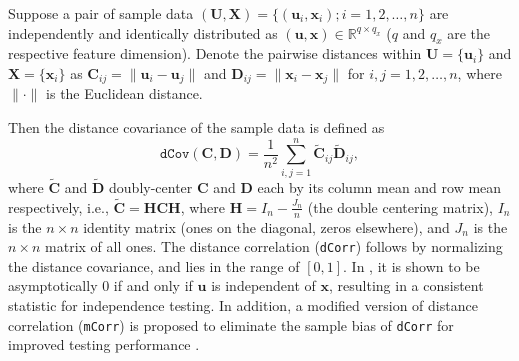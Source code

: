 \documentclass[11pt]{article}
\theoremstyle{definition}
\begin{document}
Suppose a pair of sample data $(\mathbf{U}, \mathbf{X}) = \{  (\mathbf{u}_{i}, \mathbf{x}_{i} ); i = 1,2, \ldots, n \}$ are independently and identically distributed as $(\mathbf{u},\mathbf{x}) \in \mathbb{R}^{q \times q_x}$ ($q$ and $q_x$ are the respective feature dimension). Denote the pairwise distances within $\mathbf{U}=\{\mathbf{u}_{i}\}$ and $\mathbf{X}=\{\mathbf{x}_{i}\}$ as $\mathbf{C}_{ij} = \| \mathbf{u}_{i} - \mathbf{u}_{j} \|$ and $\mathbf{D}_{ij} = \| \mathbf{x}_{i} - \mathbf{x}_{j} \|$ for $i,j=1,2, \ldots , n$, where $\| \cdot \|$ is the Euclidean distance.

Then the distance covariance of the sample data is defined as 
\begin{equation}	 
\label{eq:dCov}
\texttt{dCov}(\mathbf{C}, \mathbf{D}) = \frac{1}{n^2} \sum\limits_{i,j=1}^{n} \tilde{\mathbf{C}}_{ij} \tilde{\mathbf{D}}_{ij},
\end{equation}
where $\tilde{\mathbf{C}}$ and $\tilde{\mathbf{D}}$ doubly-center $\mathbf{C}$ and $\mathbf{D}$ each by its column mean and row mean respectively, i.e., $\tilde{\mathbf{C}}=\mathbf{H}\mathbf{C}\mathbf{H}$, where $\mathbf{H}=I_{n}-\frac{J_{n}}{n}$ (the double centering matrix), $I_n$ is the $n \times n$ identity matrix (ones on the diagonal, zeros elsewhere), and $J_n$ is the $n \times n$ matrix of all ones. The distance correlation (\texttt{dCorr}) follows by normalizing the distance covariance, and lies in the range of $[0,1]$. In \cite{szekely2007measuring}, it is shown to be asymptotically $0$ if and only if $\mathbf{u}$ is independent of $\mathbf{x}$, resulting in a consistent statistic for independence testing. In addition, a modified version of distance correlation (\texttt{mCorr}) is proposed to eliminate the sample bias of \texttt{dCorr} for improved testing performance \cite{szekely2013distance, SzekelyRizzo2014}.
\end{document}
